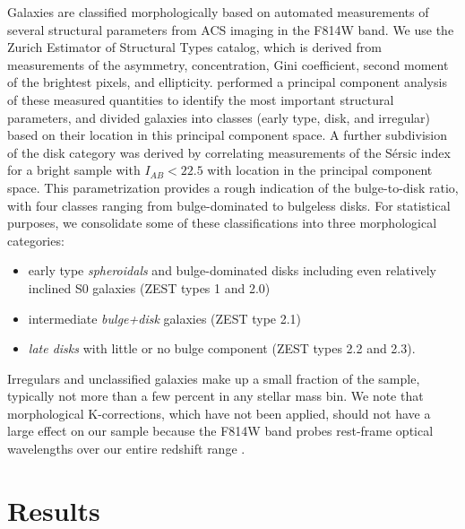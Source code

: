 Galaxies are classified morphologically based on automated
measurements of several structural parameters from ACS imaging
in the F814W band. We use the Zurich Estimator of Structural Types
\citep[ZEST;][]{Scarlata2007} catalog, which is derived from
measurements of the asymmetry, concentration, Gini coefficient, second
moment of the brightest pixels, and ellipticity. \citet{Scarlata2007}
performed a principal component analysis of these measured quantities
to identify the most important structural parameters, and divided
galaxies into classes (early type, disk, and irregular) based on their
location in this principal component space. A further subdivision of
the disk category was derived by correlating measurements of the
S\'{e}rsic index for a bright sample with $I_{AB}<22.5$ with location in the principal
component space. This parametrization provides a rough indication of
the bulge-to-disk ratio, with four classes ranging from
bulge-dominated to bulgeless disks. For statistical purposes, we
consolidate some of these classifications into three morphological
categories: 
\begin{itemize}
\item{early type \textit{spheroidals} and bulge-dominated
disks including even relatively inclined S0 galaxies (ZEST types 1 and
2.0)}
\item{intermediate \textit{bulge+disk} galaxies (ZEST type 2.1)}
\item{\textit{late disks} with little or no bulge component (ZEST types 2.2 and
2.3).}
\end{itemize}
Irregulars and unclassified galaxies make up a small fraction of
the sample, typically not more than a few percent in any stellar mass
bin. We note that morphological K-corrections, which have not been
applied, should not have a large effect on our sample because the F814W band probes rest-frame
optical wavelengths over our entire redshift range
\citep[e.g.,][]{Lotz2004, Cassata2005, Bundy2010}.


\section{Results}
\label{tran_s:results}

